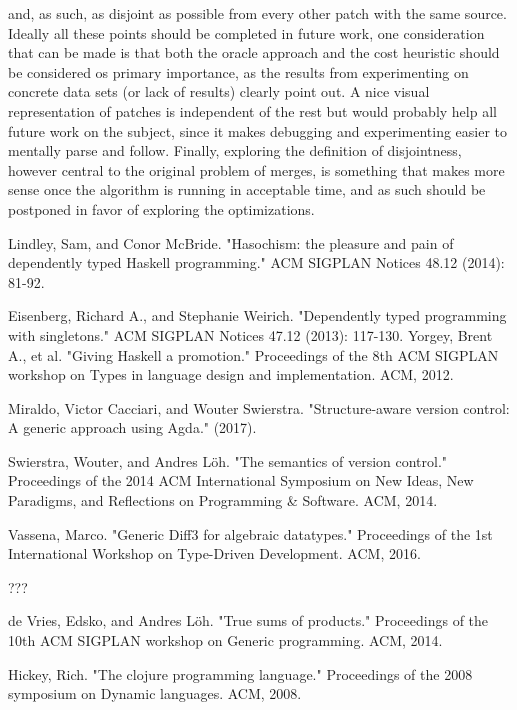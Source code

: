 \documentclass[11pt]{article}
\begin{document}
and, as such, as disjoint as possible from every other patch with the same source.
\vfill
Ideally all these points should be completed in future work, one consideration 
that can be made is that both the oracle approach and the cost heuristic should 
be considered os primary importance, as the results from experimenting on 
concrete data sets (or lack of results) clearly point out. 
A nice visual representation of patches is independent of the rest but would 
probably help all future work on the subject, since it makes debugging and 
experimenting easier to mentally parse and follow.
Finally, exploring the definition of disjointness, however central to the original problem of merges, is something that makes more 
sense once the algorithm is running in acceptable time, and as such should be 
postponed in favor of exploring the optimizations.
\begin{thebibliography}{9}
  

  Lindley, Sam, and Conor McBride. "Hasochism: the pleasure and pain of dependently typed Haskell programming." ACM SIGPLAN Notices 48.12 (2014): 81-92.

  Eisenberg, Richard A., and Stephanie Weirich. "Dependently typed programming with singletons." ACM SIGPLAN Notices 47.12 (2013): 117-130.
  Yorgey, Brent A., et al. "Giving Haskell a promotion." Proceedings of the 8th ACM SIGPLAN workshop on Types in language design and implementation. ACM, 2012.
  
   Miraldo, Victor Cacciari, and Wouter Swierstra. "Structure-aware version control: A generic approach using Agda." (2017).

  Swierstra, Wouter, and Andres Löh. "The semantics of version control." Proceedings of the 2014 ACM International Symposium on New Ideas, New Paradigms, and Reflections on Programming & Software. ACM, 2014.
  
  Vassena, Marco. "Generic Diff3 for algebraic datatypes." Proceedings of the 1st International Workshop on Type-Driven Development. ACM, 2016.

  ???
  
  de Vries, Edsko, and Andres Löh. "True sums of products." Proceedings of the 10th ACM SIGPLAN workshop on Generic programming. ACM, 2014.
  
Hickey, Rich. "The clojure programming language." Proceedings of the 2008 symposium on Dynamic languages. ACM, 2008.
 \end{thebibliography}
\end{document}
